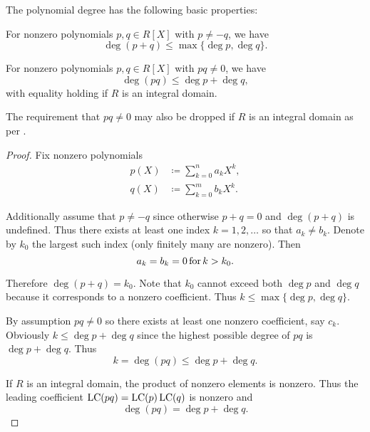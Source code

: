 \begin{proposition}\label{thm:polynomial_degree_properties}
  The polynomial degree has the following basic properties:
  \begin{thmenum}
     For nonzero polynomials \( p, q \in R[X] \) with \( p \neq -q \), we have
    \begin{equation*}
      \deg (p + q) \leq \max \{ \deg p, \deg q \}.
    \end{equation*}

     For nonzero polynomials \( p, q \in R[X] \) with \( pq \neq 0 \), we have
    \begin{equation*}
      \deg (pq) \leq \deg p + \deg q,
    \end{equation*}
    with equality holding if \( R \) is an integral domain.

    The requirement that \( pq \neq 0 \) may also be dropped if \( R \) is an integral domain as per .
  \end{thmenum}
\end{proposition}
\begin{proof}
  Fix nonzero polynomials
  \begin{align}
    p(X) &\coloneqq \sum_{k=0}^n a_k X^k, \label{eq:thm:polynomial_degree_properties/p} \\
    q(X) &\coloneqq \sum_{k=0}^m b_k X^k. \label{eq:thm:polynomial_degree_properties/q}
  \end{align}

   Additionally assume that \( p \neq -q \) since otherwise \( p + q = 0 \) and \( \deg(p + q) \) is undefined. Thus there exists at least one index \( k = 1, 2, \ldots \) so that \( a_k \neq b_k \). Denote by \( k_0 \) the largest such index (only finitely many are nonzero). Then
  \begin{equation*}
    a_k = b_k = 0 \mathop{\text{for}} k > k_0.
  \end{equation*}

  Therefore \( \deg(p + q) = k_0 \). Note that \( k_0 \) cannot exceed both \( \deg p \) and \( \deg q \) because it corresponds to a nonzero coefficient. Thus \( k \leq \max\{ \deg p, \deg q \} \).

   By assumption \( pq \neq 0 \) so there exists at least one nonzero coefficient, say \( c_k \). Obviously \( k \leq \deg p + \deg q \) since the highest possible degree of \( pq \) is \( \deg p + \deg q \). Thus
  \begin{equation*}
    k = \deg (pq) \leq \deg p + \deg q.
  \end{equation*}

  If \( R \) is an integral domain, the product of nonzero elements is nonzero. Thus the leading coefficient \( \operatorname{LC}(pq) = \operatorname{LC}(p)\operatorname{LC}(q) \) is nonzero and
  \begin{equation*}
    \deg(pq) = \deg p + \deg q.
  \end{equation*}
\end{proof}

